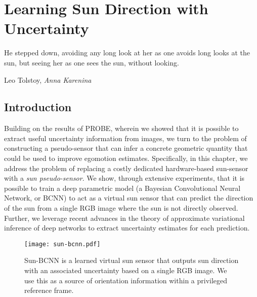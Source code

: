 \chapter{Learning Sun Direction with Uncertainty}
\epigraph{He stepped down, avoiding any long look at her as one avoids long looks at the sun, but seeing her as one sees the sun, without looking.}{Leo Tolstoy, \textit{Anna Karenina}}
\label{ch:sun-bcnn}

\section{Introduction}

Building on the results of PROBE, wherein we showed that it is possible to extract useful uncertainty information from images, we turn to the problem of constructing a pseudo-sensor that can infer a concrete geometric quantity that could be used to improve egomotion estimates. Specifically, in this chapter, we address the problem of replacing a costly dedicated hardware-based sun-sensor with a \textit{sun pseudo-sensor}. We show, through extensive experiments, that it is possible to train a deep parametric model (a Bayesian Convolutional Neural Network, or BCNN) to act as a virtual sun sensor that can predict the direction of the sun from a single RGB image where the sun is not directly observed. Further, we leverage recent advances in the theory of approximate variational inference of deep networks to extract uncertainty estimates for each prediction.


\begin{figure*}[h!]
\centering
\texttt{[image: sun-bcnn.pdf]}
 \caption{Sun-BCNN is a learned virtual sun sensor that outputs sun direction with an associated uncertainty based on a single RGB image. We use this as a source of orientation information within a privileged reference frame.}
 \label{fig:sun-bcnn_intro_fig}
\end{figure*}

